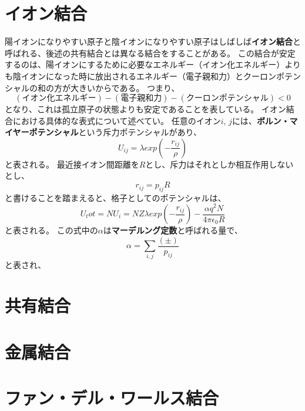 \documentclass[a4paper]{jsreport}
\begin{document}
        \section{イオン結合}
            陽イオンになりやすい原子と陰イオンになりやすい原子はしばしば\textbf{イオン結合}と呼ばれる、後述の共有結合とは異なる結合をすることがある。
            この結合が安定するのは、陽イオンにするために必要なエネルギー（イオン化エネルギー）よりも陰イオンになった時に放出されるエネルギー（電子親和力）とクーロンポテンシャルの和の方が大きいからである。
            つまり、
            \begin{equation}
                (イオン化エネルギー) - (電子親和力) - (クーロンポテンシャル) < 0
            \end{equation}
            となり、これは孤立原子の状態よりも安定であることを表している。
            イオン結合における具体的な表式について述べてい。
            任意のイオン$i$, $j$には、\textbf{ボルン・マイヤーポテンシャル}という斥力ポテンシャルがあり、
            \begin{equation}
                U_{ij} = \lambda exp\left( - \frac{r_{ij}}{\rho} \right)
            \end{equation}
            と表される。
            最近接イオン間距離を$R$とし、斥力はそれとしか相互作用しないとし、
            \begin{equation}
                r_{ij} = p_{ij}R
            \end{equation}
            と書けることを踏まえると、格子としてのポテンシャルは、
            \begin{equation}
                U_tot = NU_i = NZ \lambda exp\left( - \frac{r_{ij}}{\rho} \right) - \frac{\alpha q^2 N}{4 \pi \epsilon_0 R }
            \end{equation}
            と表される。
            この式中の$\alpha$は\textbf{マーデルング定数}と呼ばれる量で、
            \begin{equation}
                \alpha = \sum_{i,j} \frac{(\pm)}{p_{ij}}
            \end{equation}
            と表され、

        \section{共有結合}
        \section{金属結合}
        \section{ファン・デル・ワールス結合}
\end{document}
